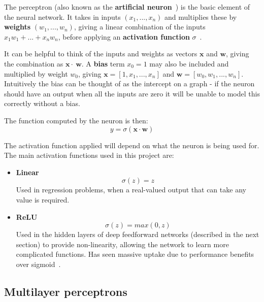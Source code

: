 \documentclass[12pt,a4paper,twoside,openright]{report}
\renewcommand{\vec}[1]{\bm{#1}}
\begin{document}
The perceptron (also known as the \textbf{artificial neuron}~\cite{WhatareA61:online}) is the basic element of the neural network. It takes in inputs $(x_1, ..., x_n)$ and 
multiplies these by \textbf{weights} $(w_1, ..., w_n)$, giving a linear combination of the inputs $x_1w_1 + ... + x_nw_n$, before applying 
an \textbf{activation function} $\sigma$~\cite{Art_Int}.

It can be helpful to think of the inputs and weights as 
vectors $\vec{x}$ and $\vec{w}$, giving the combination as $\vec{x} \cdot \ \vec{w}$. A \textbf{bias} term $x_0=1$ may also be included and multiplied by 
weight $w_0$, giving $\vec{x} = [1, x_1, ..., x_n]$ and $\vec{w} = [w_0, w_1, ..., w_n]$. Intuitively the bias can be thought of as the intercept
on a graph - if the neuron should have an output when all the inputs are zero it will be unable to model this correctly without a bias.

The function computed by the neuron is then:
\begin{equation}
  y = \sigma(\vec{x} \cdot \vec{w})
\end{equation}

The activation function applied will depend on what the neuron is being used for.
The main activation functions used in this project are:
\begin{itemize}
  \item \textbf{Linear}
        \begin{equation}
          \sigma(z) = z
        \end{equation}
        Used in regression problems, when a real-valued output that can take any value is required.
  \item \textbf{ReLU}
        \begin{equation}
          \sigma(z) = max(0, z)
          \label{eq:relu}
        \end{equation}
        Used in the hidden layers of deep feedforward networks (described in the next section) to provide non-linearity, allowing the network to learn more 
        complicated functions. Has seen massive uptake due to performance benefits over sigmoid~\cite{relu}.
\end{itemize}

\subsection{Multilayer perceptrons}
\end{document}
